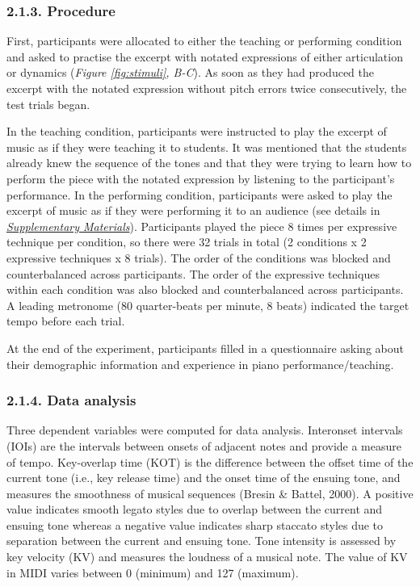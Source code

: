 \documentclass[
  english,
  man,floatsintext]{apa6}
\begin{document}
\hypertarget{procedure}{%
\subsubsection{2.1.3. Procedure}\label{procedure}}

First, participants were allocated to either the teaching or performing condition and asked to practise the excerpt with notated expressions of either articulation or dynamics (\emph{Figure \ref{fig:stimuli}, B-C}). As soon as they had produced the excerpt with the notated expression without pitch errors twice consecutively, the test trials began.

In the teaching condition, participants were instructed to play the excerpt of music as if they were teaching it to students. It was mentioned that the students already knew the sequence of the tones and that they were trying to learn how to perform the piece with the notated expression by listening to the participant's performance. In the performing condition, participants were asked to play the excerpt of music as if they were performing it to an audience (see details in \emph{\protect\hyperlink{supplementary}{Supplementary Materials}}). Participants played the piece 8 times per expressive technique per condition, so there were 32 trials in total (2 conditions x 2 expressive techniques x 8 trials). The order of the conditions was blocked and counterbalanced across participants. The order of the expressive techniques within each condition was also blocked and counterbalanced across participants. A leading metronome (80 quarter-beats per minute, 8 beats) indicated the target tempo before each trial.

At the end of the experiment, participants filled in a questionnaire asking about their demographic information and experience in piano performance/teaching.

\hypertarget{data-analysis}{%
\subsubsection{2.1.4. Data analysis}\label{data-analysis}}

Three dependent variables were computed for data analysis. Interonset intervals (IOIs) are the intervals between onsets of adjacent notes and provide a measure of tempo. Key-overlap time (KOT) is the difference between the offset time of the current tone (i.e., key release time) and the onset time of the ensuing tone, and measures the smoothness of musical sequences (Bresin \& Battel, 2000). A positive value indicates smooth legato styles due to overlap between the current and ensuing tone whereas a negative value indicates sharp staccato styles due to separation between the current and ensuing tone. Tone intensity is assessed by key velocity (KV) and measures the loudness of a musical note. The value of KV in MIDI varies between 0 (minimum) and 127 (maximum).
\end{document}
